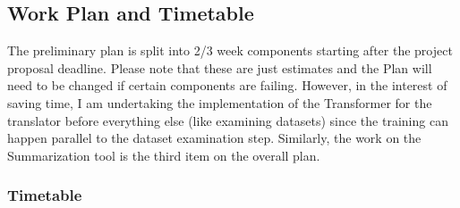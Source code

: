 \documentclass[12pt, a4paper]{article}
\begin{document}
\subsection*{Work Plan and Timetable}
 
The preliminary plan is split into 2/3 week components starting after the project proposal deadline. Please note that these are just estimates and the Plan will need to be changed if certain components are failing. However, in the interest of saving time, I am undertaking the implementation of the Transformer for the translator before everything else (like examining datasets) since the training can happen parallel to the dataset examination step. Similarly, the work on the Summarization tool is the third item on the overall plan. 
 
\subsubsection*{Timetable}
\end{document}
